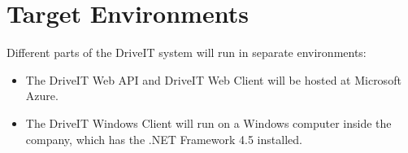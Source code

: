 \section{Target Environments}
Different parts of the DriveIT system will run in separate environments:
\begin{itemize}
	\item The DriveIT Web API and DriveIT Web Client will be hosted at Microsoft Azure.
	\item The DriveIT Windows Client will run on a Windows computer inside the  company, which has the .NET Framework 4.5 installed.
\end{itemize}